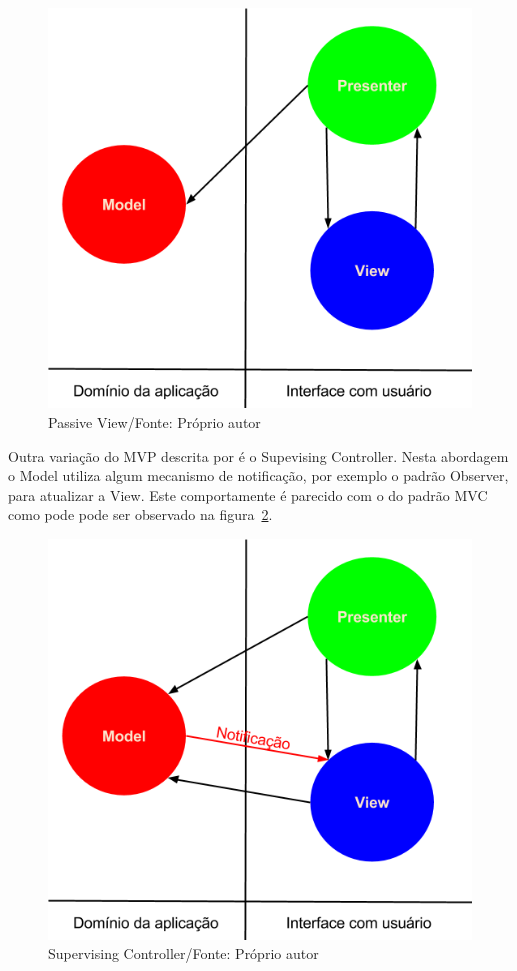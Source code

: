 \begin{figure}[ht]
	\centering
	\includegraphics[scale=0.5]{img/passive_view.png}
	\caption{Passive View/Fonte: Próprio autor}
	\label{fig:mvp_passive_view}
\end{figure}

Outra variação do MVP descrita por  é o Supevising
Controller. Nesta abordagem o Model utiliza algum mecanismo de notificação, por
exemplo o padrão Observer, para atualizar a View. Este comportamente é parecido
com o do padrão MVC como pode pode ser observado na
figura~\ref{fig:sup_controller}.

\begin{figure}[ht]
	\centering
	\includegraphics[scale=0.5]{img/supervising_controller.png}
	\caption{Supervising Controller/Fonte: Próprio autor}
	\label{fig:sup_controller}
\end{figure}


